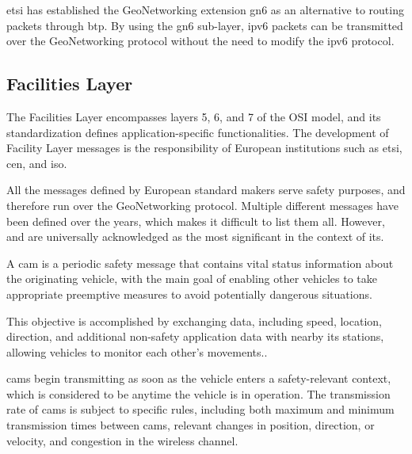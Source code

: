 \gls{etsi} has established the GeoNetworking extension \gls{gn6} as an alternative to routing packets through \gls{btp}. By using the \gls{gn6} sub-layer, \gls{ipv6} packets can be transmitted over the GeoNetworking protocol without the need to modify the \gls{ipv6} protocol\cite{festag_cooperative_2014}.


\subsection[Facilities Layer]{Facilities Layer}
\label{subsec:Facilities}

The Facilities Layer encompasses layers 5, 6, and 7 of the OSI model, and its standardization defines application-specific functionalities\cite{festag_standards_2015}. The development of Facility Layer messages is the responsibility of European institutions such as \gls{etsi}, \gls{cen}, and \gls{iso}.

All the messages defined by European standard makers serve safety purposes, and therefore run over the GeoNetworking protocol\cite{festag_standards_2015}. Multiple different messages have been defined over the years\cite{festag_cooperative_2014}, which makes it difficult to list them all. However,  and  are universally acknowledged as the most significant in the context of \gls{its}.

A \gls{cam}\cite{etsi_intelligent_2019-2} is a periodic safety message that contains vital status information about the originating vehicle, with the main goal of enabling other vehicles to take appropriate preemptive measures to avoid potentially dangerous situations\cite{al-sultan_comprehensive_2014}.

This objective is accomplished by exchanging data, including speed, location, direction, and additional non-safety application data with nearby \gls{its} stations, allowing vehicles to monitor each other's movements.\cite{festag_standards_2015}.

\glspl{cam} begin transmitting as soon as the vehicle enters a safety-relevant context, which is considered to be anytime the vehicle is in operation.\cite{festag_cooperative_2014} The transmission rate of \glspl{cam} is subject to specific rules, including both maximum and minimum transmission times between \glspl{cam}, relevant changes in position, direction, or velocity, and congestion in the wireless channel\cite{festag_cooperative_2014}.

